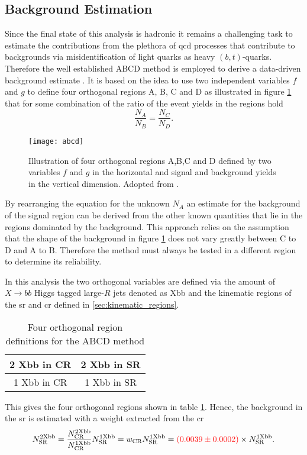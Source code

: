 \subsection{Background Estimation}\label{sec:abcd}
Since the final state of this analysis is hadronic it remains a challenging task to estimate the contributions from the plethora of \ac{qcd} processes that contribute to backgrounds via  misidentification of light quarks as heavy $(b, t)$-quarks. Therefore the well established ABCD method is employed to derive a data-driven background estimate \citep{buttinger2018background,PhysRevD.103.035021}. It is based on the idea to use two independent variables $f$ and $g$ to define four orthogonal regions A, B, C and D as illustrated in figure \ref{fig:abcd} that for some combination of the ratio of the event yields in the regions hold
\begin{equation}
    \frac{N_A}{N_B}=\frac{N_C}{N_D}.
\end{equation}
\begin{figure}
    \centering
    \texttt{[image: abcd]}
    \caption[]{Illustration of four orthogonal regions A,B,C and D defined by two variables $f$ and $g$ in the horizontal and signal and background yields in the vertical dimension. Adopted from \citep{PhysRevD.103.035021}.}
    \label{fig:abcd}
\end{figure}
By rearranging the equation for the unknown $N_A$ an estimate for the background of the signal region can be derived from the other known quantities that lie in the regions dominated by the background. This approach relies on the assumption that the shape of the background in figure \ref{fig:abcd} does not vary greatly between C to D and A to B. Therefore the method must always be tested in a different region to determine its reliability.


In this analysis the two orthogonal variables are defined via the amount of $X\rightarrow bb$ Higgs tagged large-$R$ jets denoted as Xbb and the kinematic regions of the \ac{sr} and \ac{cr} defined in \ref{sec:kinematic_regions}.
\begin{table}[htbp]
    \centering
    \caption{Four orthogonal region definitions for the ABCD method}
    \begin{tabular}{|c|c|}
        \hline
        2 Xbb in CR & 2 Xbb in SR \\ \hline
        1 Xbb in CR & 1 Xbb in SR \\ \hline
    \end{tabular}
    \label{tab:abcd}
\end{table}
This gives the four orthogonal regions shown in table \ref{tab:abcd}. Hence, the background in the \ac{sr} is estimated with a weight extracted from the \ac{cr}
\begin{equation}
    N_\text{SR}^\text{2Xbb}=\frac{N_\text{CR}^\text{2Xbb}}{N_\text{CR}^\text{1Xbb}} N_\text{SR}^\text{1Xbb} = w_\text{CR} N_\text{SR}^\text{1Xbb}=  \textcolor{red}{(0.0039 \pm 0.0002)} \times N_\text{SR}^\text{1Xbb}.
\end{equation}


